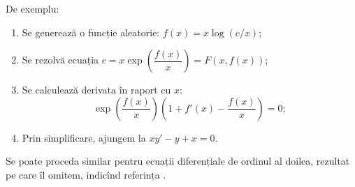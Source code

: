 De exemplu:
\begin{enumerate}[(1)]
    \item Se generează o funcție aleatorie: $ f(x) = x \log(c/x) $;
    \item Se rezolvă ecuația $ c = x\exp\left( \dfrac{f(x)}{x} \right) = F(x, f(x)) $;
    \item Se calculează derivata în raport cu $ x $:
        \[
            \exp\left( \frac{f(x)}{x} \right) \left(1 + f'(x) - \frac{f(x)}{x} \right) = 0;
        \]
    \item Prin simplificare, ajungem la $ xy' - y + x = 0 $.
\end{enumerate}

\begin{remark}\label{rk:ode2}
    Se poate proceda similar pentru ecuații diferențiale de ordinul al doilea,
    rezultat pe care îl omitem, indicînd referința \cite[\S 3.3]{lample2019deep}.
\end{remark}

